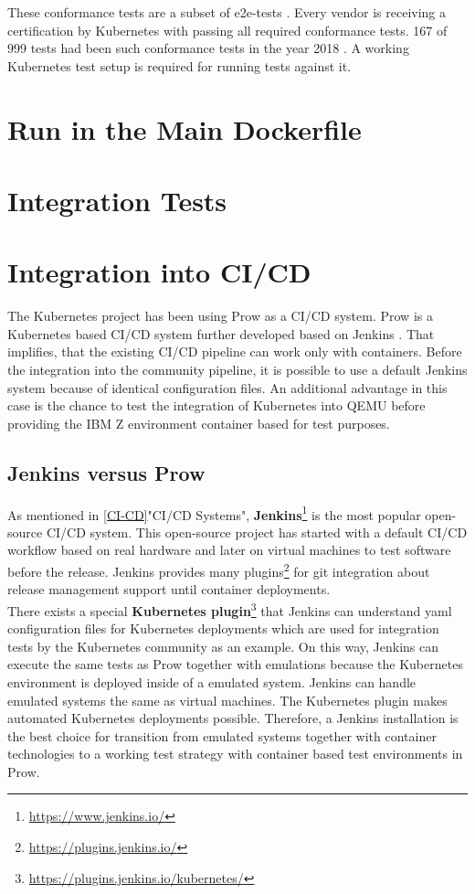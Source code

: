 These conformance tests are a subset of e2e-tests \cite[~p.8]{Omichi2018}. Every vendor is receiving a certification by Kubernetes with passing all required conformance tests. 167 of 999 tests had been such conformance tests in the year 2018 \cite[~p.9]{Omichi2018}.
A working Kubernetes test setup is required for running tests against it.

\section{Run in the Main Dockerfile}

\section{Integration Tests}

\section{Integration into CI/CD}

The Kubernetes project has been using Prow as a CI/CD system. Prow is a Kubernetes based CI/CD system further developed based on Jenkins \cite{JAXenter}. That implifies, that the existing CI/CD pipeline can work only with containers.
Before the integration into the community pipeline, it is possible to use a default Jenkins system because of identical configuration files. An additional advantage in this case is the chance to test the integration of Kubernetes into QEMU before providing the IBM Z environment container based for test purposes.

\subsection{Jenkins versus Prow}

As mentioned in \ref{CI-CD}"CI/CD Systems", \textbf{Jenkins}\footnote{\url{https://www.jenkins.io/}} is the most popular open-source CI/CD system. This open-source project has started with a default CI/CD workflow based on real hardware and later on virtual machines to test software before the release. Jenkins provides many plugins\footnote{\url{https://plugins.jenkins.io/}} for git integration about release management support until container deployments. \\
There exists a special \textbf{Kubernetes plugin}\footnote{\url{https://plugins.jenkins.io/kubernetes/}} that Jenkins can understand yaml configuration files for Kubernetes deployments which are used for integration tests by the Kubernetes community as an example. On this way, Jenkins can execute the same tests as Prow together with emulations because the Kubernetes environment is deployed inside of a emulated system. Jenkins can handle emulated systems the same as virtual machines. The Kubernetes plugin makes automated Kubernetes deployments possible. Therefore, a Jenkins installation is the best choice for transition from emulated systems together with container technologies to a working test strategy with container based test environments in Prow.

